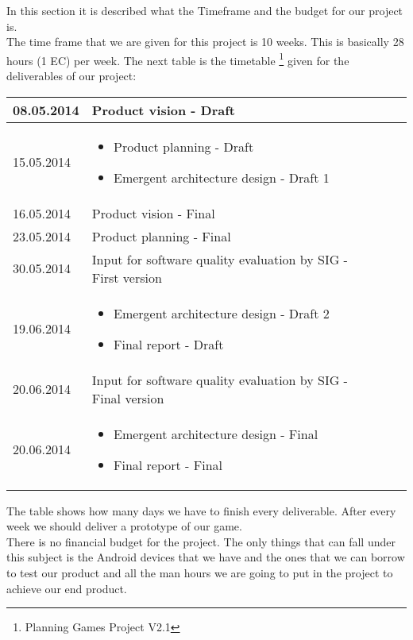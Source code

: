 In this section it is described what the Timeframe and the budget for our project is. \\
The time frame that we are given for this project is 10 weeks. This is basically 28 hours (1 EC) per week. 
The next table is the timetable \footnote{Planning Games Project V2.1} given for the deliverables of our project:
\begin{center}
	\begin{tabular}{|  p{5cm} l || p{10cm}  l }
		\hline
	 	08.05.2014 & Product vision - Draft \\ \hline
		15.05.2014 & 
		\begin{itemize}
			\item Product planning - Draft
			\item Emergent architecture design - Draft 1
		\end{itemize} \\ \hline
		16.05.2014 & Product vision - Final \\ \hline
		23.05.2014 & Product planning - Final \\ \hline
		30.05.2014 & Input for software quality evaluation by SIG - First version \\ \hline
		19.06.2014 &
		\begin{itemize}
			\item Emergent architecture design - Draft 2
			\item Final report - Draft
		\end{itemize} \\ \hline
		20.06.2014 & Input for software quality evaluation by SIG - Final version \\ \hline
		20.06.2014 &
		\begin{itemize}
			\item Emergent architecture design - Final
			\item Final report - Final
		\end{itemize} \\
		\hline
	\end{tabular}
\end{center}
The table shows how many days we have to finish every deliverable. After every week we should deliver a prototype of our game. \\
\newline
There is no financial budget for the project. The only things that can fall under this subject is the Android devices that we have and the ones that we can borrow to test our product and all the man hours we are going to put in the project to achieve our end product.
